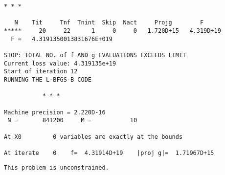 \documentclass[11pt]{article}
\begin{document}
\begin{Verbatim}[commandchars=\\\{\}]
           * * *

   N    Tit     Tnf  Tnint  Skip  Nact     Projg        F
*****     20     22      1     0     0   1.720D+15   4.319D+19
  F =   4.3191350013831676E+019

STOP: TOTAL NO. of f AND g EVALUATIONS EXCEEDS LIMIT
Current loss value: 4.319135e+19
Start of iteration 12
RUNNING THE L-BFGS-B CODE

           * * *

Machine precision = 2.220D-16
 N =       841200     M =           10

At X0         0 variables are exactly at the bounds

At iterate    0    f=  4.31914D+19    |proj g|=  1.71967D+15
    \end{Verbatim}

    \begin{Verbatim}[commandchars=\\\{\}]
 This problem is unconstrained.
    \end{Verbatim}
\end{document}

